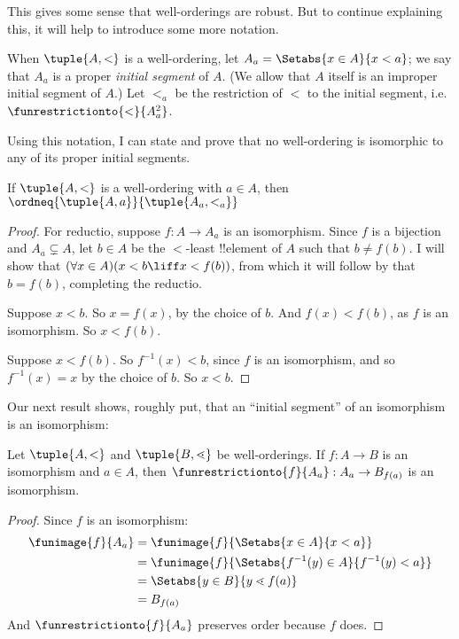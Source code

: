\documentclass[../../../include/open-logic-section]{subfiles}
\begin{document}
This gives some sense that well-orderings are robust. But to continue explaining this, it will help to introduce some more notation. 
\begin{defn}
	When $\tuple{A, <}$ is a well-ordering, let $A_a = \Setabs{x \in A}{x < a}$; we say that $A_a$ is a proper \emph{initial segment} of $A$. (We allow that $A$ itself is an improper initial segment of $A$.) Let $<_a$ be the restriction of $<$ to the initial segment, i.e.\  $\funrestrictionto{\mathord{<}}{A_a^2}$. 
\end{defn}\noindent
Using this notation, I can state and prove that no well-ordering is isomorphic to any of its proper initial segments.
\begin{lem}
	If $\tuple{A, <}$ is a well-ordering with $a \in A$, then $\ordneq{\tuple{A, a}}{\tuple{A_a, <_a}}$ 
\end{lem}
\begin{proof}
	For reductio, suppose $f \colon A \to A_a$ is an isomorphism. Since $f$ is a bijection and $A_a \subsetneq A$, let $b \in A$ be the $<$-least !!{element} of $A$ such that $b \neq f(b)$. I will show that $(\forall x \in A)(x<b \liff x < f(b))$, from which it will follow by  that $b = f(b)$, completing the reductio.
	
	Suppose $x < b$. So $x = f(x)$, by the choice of $b$. And $f(x) < f(b)$, as $f$ is an isomorphism. So $x < f(b)$.
	
	Suppose $x < f(b)$. So $f^{-1}(x) < b$, since $f$ is an isomorphism, and so $f^{-1}(x) = x$ by the choice of $b$. So $x < b$. 
\end{proof}\noindent
Our next result shows, roughly put, that an ``initial segment'' of an isomorphism is an isomorphism:
\begin{lem}
	Let $\tuple{A, <}$ and $\tuple{B, \lessdot}$ be well-orderings. If $f \colon A \to B$ is an isomorphism and $a \in A$, then $\funrestrictionto{f}{A_{a}} : A_a \to B_{f(a)}$ is an isomorphism.
\end{lem}
\begin{proof}
	Since $f$ is an isomorphism:
	\begin{align*}
		\funimage{f}{A_a} &= \funimage{f}{\Setabs{x \in A}{x < a}}\\
		&= \funimage{f}{\Setabs{f^{-1}(y) \in A}{f^{-1}(y) < a}} \\
		&= \Setabs{y \in B}{y \lessdot f(a)} \\
		&=B_{f(a)} 
		\end{align*}
	And $\funrestrictionto{f}{A_a}$ preserves order because $f$ does. 
\end{proof}\noindent
\end{document}
